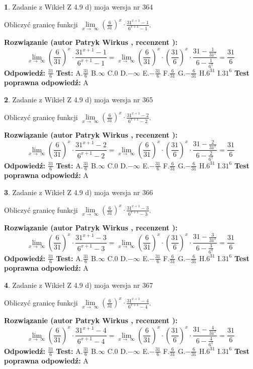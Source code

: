 \documentclass[12pt, a4paper]{article}
\theoremstyle{definition} %
\newtheorem{zad}{}
\newcommand{\zadStart}[1]{\begin{zad}#1\newline}
\newcommand{\zadStop}{\end{zad}}
\newcommand{\rozwStart}[2]{\noindent \textbf{Rozwiązanie (autor #1 , recenzent #2): }\newline}
\newcommand{\rozwStop}{\newline}
\newcommand{\odpStart}{\noindent \textbf{Odpowiedź:}\newline}
\newcommand{\odpStop}{\newline}
\newcommand{\testStart}{\noindent \textbf{Test:}\newline}
\newcommand{\testStop}{\newline}
\newcommand{\kluczStart}{\noindent \textbf{Test poprawna odpowiedź:}\newline}
\newcommand{\kluczStop}{\newline}
\begin{document}
\zadStart{Zadanie z Wikieł Z 4.9 d) moja wersja nr 364}


Obliczyć granicę funkcji  $\lim\limits_{x\to\ \infty}(\frac{6}{31})^{x}\cdot\frac{31^{x+1}-1}{6^{x+1}-1}$.
\zadStop
\rozwStart{Patryk Wirkus}{}
$$\lim\limits_{x\to\ \infty}(\frac{6}{31})^{x}\cdot\frac{31^{x+1}-1}{6^{x+1}-1}=\lim\limits_{x\to\ \infty}(\frac{6}{31})^{x}\cdot(\frac{31}{6})^{x} \cdot \frac{31-\frac{1}{31^{x}}}{6-\frac{1}{6^{x}}} = \frac{31}{6}$$
\rozwStop
\odpStart
$\frac{31}{6}$
\odpStop
\testStart
A.$\frac{31}{6}$ B.$\infty$ C.$0$ D.$-\infty$ E.$-\frac{31}{6}$
F.$\frac{6}{31}$ G.$-\frac{6}{31}$
H.$6^{31}$
I.$31^{6}$
\testStop
\kluczStart
A
\kluczStop



\zadStart{Zadanie z Wikieł Z 4.9 d) moja wersja nr 365}


Obliczyć granicę funkcji  $\lim\limits_{x\to\ \infty}(\frac{6}{31})^{x}\cdot\frac{31^{x+1}-2}{6^{x+1}-2}$.
\zadStop
\rozwStart{Patryk Wirkus}{}
$$\lim\limits_{x\to\ \infty}(\frac{6}{31})^{x}\cdot\frac{31^{x+1}-2}{6^{x+1}-2}=\lim\limits_{x\to\ \infty}(\frac{6}{31})^{x}\cdot(\frac{31}{6})^{x} \cdot \frac{31-\frac{2}{31^{x}}}{6-\frac{2}{6^{x}}} = \frac{31}{6}$$
\rozwStop
\odpStart
$\frac{31}{6}$
\odpStop
\testStart
A.$\frac{31}{6}$ B.$\infty$ C.$0$ D.$-\infty$ E.$-\frac{31}{6}$
F.$\frac{6}{31}$ G.$-\frac{6}{31}$
H.$6^{31}$
I.$31^{6}$
\testStop
\kluczStart
A
\kluczStop



\zadStart{Zadanie z Wikieł Z 4.9 d) moja wersja nr 366}


Obliczyć granicę funkcji  $\lim\limits_{x\to\ \infty}(\frac{6}{31})^{x}\cdot\frac{31^{x+1}-3}{6^{x+1}-3}$.
\zadStop
\rozwStart{Patryk Wirkus}{}
$$\lim\limits_{x\to\ \infty}(\frac{6}{31})^{x}\cdot\frac{31^{x+1}-3}{6^{x+1}-3}=\lim\limits_{x\to\ \infty}(\frac{6}{31})^{x}\cdot(\frac{31}{6})^{x} \cdot \frac{31-\frac{3}{31^{x}}}{6-\frac{3}{6^{x}}} = \frac{31}{6}$$
\rozwStop
\odpStart
$\frac{31}{6}$
\odpStop
\testStart
A.$\frac{31}{6}$ B.$\infty$ C.$0$ D.$-\infty$ E.$-\frac{31}{6}$
F.$\frac{6}{31}$ G.$-\frac{6}{31}$
H.$6^{31}$
I.$31^{6}$
\testStop
\kluczStart
A
\kluczStop



\zadStart{Zadanie z Wikieł Z 4.9 d) moja wersja nr 367}


Obliczyć granicę funkcji  $\lim\limits_{x\to\ \infty}(\frac{6}{31})^{x}\cdot\frac{31^{x+1}-4}{6^{x+1}-4}$.
\zadStop
\rozwStart{Patryk Wirkus}{}
$$\lim\limits_{x\to\ \infty}(\frac{6}{31})^{x}\cdot\frac{31^{x+1}-4}{6^{x+1}-4}=\lim\limits_{x\to\ \infty}(\frac{6}{31})^{x}\cdot(\frac{31}{6})^{x} \cdot \frac{31-\frac{4}{31^{x}}}{6-\frac{4}{6^{x}}} = \frac{31}{6}$$
\rozwStop
\odpStart
$\frac{31}{6}$
\odpStop
\testStart
A.$\frac{31}{6}$ B.$\infty$ C.$0$ D.$-\infty$ E.$-\frac{31}{6}$
F.$\frac{6}{31}$ G.$-\frac{6}{31}$
H.$6^{31}$
I.$31^{6}$
\testStop
\kluczStart
A
\kluczStop
\end{document}
